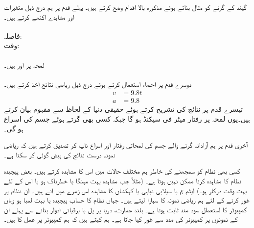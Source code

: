 گیند کے گرنے کو مثال بناتے ہوئے مذکورہ بالا اقدام وضح کرتے ہیں۔ پہلے قدم پر ہم درج ذیل متغیرات اور مشاہدے اکٹھے کرتے ہیں۔\\
\\
فاصلہ:\quad {}\\
وقت:\quad {}\\
\\
لمحہ  پر  اور  ہیں۔\\
\quad {}\\
دوسرے قدم پر احصاء استعمال کرتے ہوئے درج ذیل ریاضی نتائج اخذ کرتے ہیں۔
\begin{align*}
v&=9.8t\\
a&=9.8
\end{align*}
تیسرے قدم پر نتائج کی تشریح کرتے ہوئے حقیقی دنیا کے لحاظ سے مفہوم بیان کرتے ہیں۔یوں لمحہ  پر رفتار  میٹر فی سیکنڈ ہو گا جبکہ کسی بھی گرتے ہوئے جسم کی اسراع  ہو گی۔ 

آخری قدم پر ہم آزادانہ گرنے والے جسم  کی لمحاتی رفتار اور اسراع ناپ کر تصدیق کرتے ہیں کہ ریاضی نمونہ درست نتائج کی پیش گوئی کر سکتا ہے۔

کسی بھی نظام کو سمجھنے کی خاطر ہم مختلف حالات میں اس کا مشاہدہ کرتے ہیں۔ بعض پیچیدہ نظام کا  مشاہدہ کرنا ممکن نہیں ہوتا ہے۔ (مثلاً جب  مشاہدہ بہت مہنگا یا خطرناک ہو یا اس کے لئے بہت وقت درکار ہو۔) ایٹم بم یا سیلابی تباہی یا کہکشاں کا مشاہدہ  اس زمرے میں آتے ہیں۔ ان نظام پر غور کرنے کے لئے ہم ریاضی نمونہ کا سہارا لیتے ہیں۔ جہاں نظام کا حساب پیچیدہ یا بہت لمبا ہو وہاں کمپیوٹر کا استعمال سود مند ثابت ہوتا ہے۔ بلند عمارت، دریا پر پل یا برقیاتی ادوار بنانے سے پہلے ان کے نمونوں پر کمپیوٹر کی مدد سے غور کیا جاتا ہے۔ ہم کہتے ہیں کہ ہم کمپیوٹر پر عمل کا  ہیں۔

